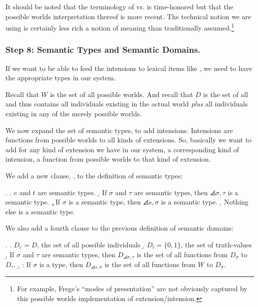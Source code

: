 It %
%
should be noted that the terminology of  vs.  is
time-honored but that the possible worlds interpretation thereof is more recent.
The technical notion we are using is certainly less rich a notion of meaning
than traditionally assumed.\footnote{For example, Frege's ``modes of
  presentation'' are not obviously captured by this possible worlds
  implementation of extension/intension.}

\subsubsection{Step 8: Semantic Types and Semantic Domains.} \label{sec:semantic-types}

If we want to be able to feed the intensions to lexical items like
, we need to have the appropriate
types in our system.

Recall that $W$ is the set of all possible worlds. And recall that $D$ is the
set of all  and thus contains all individuals
existing in the actual world \emph{plus} all individuals existing in any of the
merely possible worlds.

We now expand the set of semantic types, to add intensions. Intensions are
functions from possible worlds to all kinds of extensions. So, basically we want
to add for any kind of extension we have in our system, a corresponding kind of
intension, a function from possible worlds to that kind of extension.

We add a new clause, \Next[c], to the definition of semantic types:

\ex. 
\a. $e$ and $t$ are semantic types.
\b. If $\sigma$ and $\tau$ are semantic types, then $\angles{\sigma,\tau}$ is a semantic type.
\c. If $\sigma$ is a semantic type, then $\angles{s,\sigma}$ is a semantic type.
\d. Nothing else is a semantic type.

We also add a fourth clause to the previous definition of semantic domains:

\ex.  \a. $D_{e} = D$, the set of all possible
individuals \b. $D_{t} = \{0,1\}$, the set of truth-values \b. If $\sigma$ and
$\tau$ are semantic types, then $D_{\angles{\sigma,\tau}}$ is the set of all
functions from $D_{\sigma}$ to $D_{\tau}$. \b. : If $\sigma$ is
a type, then $D_{\angles{s,\sigma}}$ is the set of all functions from $W$ to
$D_{\sigma}$.

